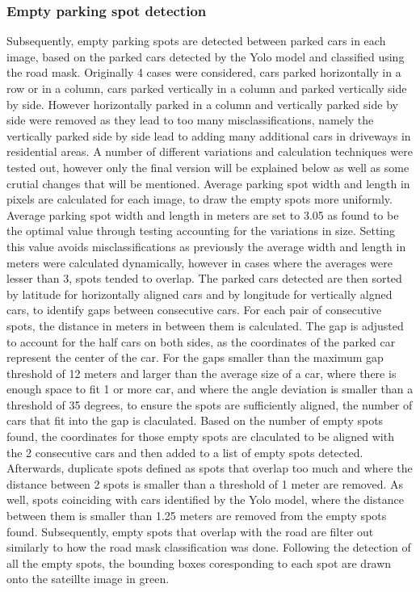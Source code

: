 \subsubsection{Empty parking spot detection}
Subsequently, empty parking spots are detected between parked cars in each image, based on the parked cars detected by the Yolo model and classified using the road mask.
Originally 4 cases were considered, cars parked horizontally in a row or in a column, cars parked vertically in a column and parked vertically side by side. However horizontally parked in a column and vertically parked side by side were removed as they lead to too many misclassifications, namely the vertically parked side by side lead to adding many additional cars in driveways in residential areas.
A number of different variations and calculation techniques were tested out, however only the final version will be explained below as well as some crutial changes that will be mentioned.
Average parking spot width and length in pixels are calculated for each image, to draw the empty spots more uniformly. Average parking spot width and length in meters are set to 3.05 as found to be the optimal value through testing accounting for the variations in size. 
Setting this value avoids misclassifications as previously the average width and length in meters were calculated dynamically, however in cases where the averages were lesser than 3, spots tended to overlap. 
The parked cars detected are then sorted by latitude for horizontally aligned cars and by longitude for vertically algned cars, to identify gaps between consecutive cars.
For each pair of consecutive spots, the distance in meters in between them is calculated. The gap is adjusted to account for the half cars on both sides, as the coordinates of the parked car represent the center of the car.
For the gaps smaller than the maximum gap threshold of 12 meters and larger than the average size of a car, where there is enough space to fit 1 or more car, and where the angle deviation is smaller than a threshold of 35 degrees, to ensure the spots are sufficiently aligned, the number of cars that fit into the gap is claculated.
Based on the number of empty spots found, the coordinates for those empty spots are claculated to be aligned with the 2 consecutive cars and then added to a list of empty spots detected.
Afterwards, duplicate spots defined as spots that overlap too much and where the distance between 2 spots is smaller than a threshold of 1 meter are removed.
As well, spots coinciding with cars identified by the Yolo model, where the distance between them is smaller than 1.25 meters are removed from the empty spots found.
Subsequently, empty spots that overlap with the road are filter out similarly to how the road mask classification was done.
Following the detection of all the empty spots, the bounding boxes coresponding to each spot are drawn onto the sateillte image in green.

